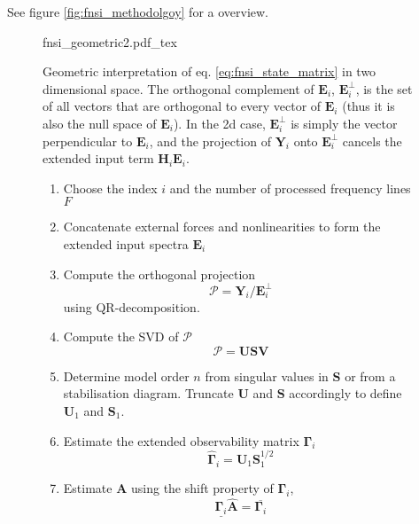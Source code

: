 See figure \ref{fig:fnsi_methodolgoy} for a overview.

\begin{figure}[!ht]
  \centering
  \def\svgwidth{6cm}
  {fnsi_geometric2.pdf_tex}
  \caption{Geometric interpretation of eq. \eqref{eq:fnsi_state_matrix} in two
    dimensional space. The orthogonal complement of $\bm E_i$, $\bm E_i^\perp$,
    is the set of all vectors that are orthogonal to every vector of $\bm E_i$
    (thus it is also the null space of $\bm E_i$).
    In the 2d case, $\bm E_i^\perp$ is simply the vector perpendicular to $\bm
    E_i$, and the projection of $\bm Y_i$ onto $\bm E_i^\perp$ cancels the
    extended input term $\bm H_i \bm E_i$. }
  \label{fig:fnsi_geometric}
\end{figure}


\begin{figure}[!ht]
  \centering
  \begin{mdframed}
    \begin{enumerate}
    \item Choose the index $i$ and the number of processed frequency lines $F$
    \item Concatenate external forces and nonlinearities to form the extended
      input spectra $\bm E_i$
    \item Compute the orthogonal projection
      \begin{equation*}
        \mathcal{P} = \bm Y_i / \bm E_i^\perp
      \end{equation*}
      using QR-decomposition.
    \item Compute the SVD of $\mathcal{P}$
      \begin{equation}
        \label{eq:fnsi_svd}
        \mathcal{P} = \bm U \bm S \bm V
      \end{equation}
    \item Determine model order $n$ from singular values in $\bm S$ or from a
      stabilisation diagram. Truncate $\bm U$ and $\bm S$ accordingly to define
      $\bm U_1$ and $\bm S_1$.
    \item Estimate the extended observability matrix $\bm \Gamma_i$
      \begin{equation*}
        \hat{\bm \Gamma}_i = \bm U_1 \bm S_1^{1/2}
      \end{equation*}
    \item Estimate $\bm A$ using the shift property of $\bm \Gamma_i$,
      \begin{equation*}
        \underline{\bm \Gamma_i} \hat {\bm A} = \overline{\bm \Gamma_i}

\end{equation*}
\end{enumerate}
\end{mdframed}
\end{figure}
